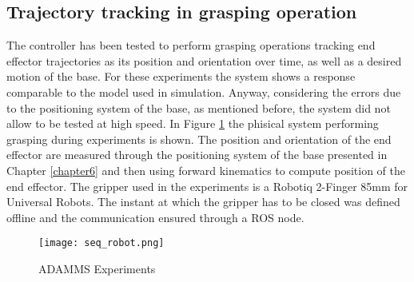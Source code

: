 \subsection{Trajectory tracking in grasping operation}

The controller has been tested to perform grasping operations tracking end effector trajectories as its position and orientation over time, as well as a desired motion of the base. For these experiments the system shows a response comparable to the model used in simulation. Anyway, considering the errors due to the positioning system of the base, as mentioned before, the system did not allow to be tested at high speed. In Figure \ref{seq_robot} the phisical system performing grasping during experiments is shown. The position and orientation of the end effector are measured through the positioning system of the base presented in Chapter \ref{chapter6} and then using forward kinematics to compute position of the end effector. The gripper used in the experiments is a Robotiq 2-Finger 85mm for Universal Robots. The instant at which the gripper has to be closed was defined offline and the communication ensured through a ROS node. 
\begin{figure}[h!]
\centering
\texttt{[image: seq\_robot.png]}
\caption{ADAMMS Experiments}
\label{seq_robot}
\end{figure}


